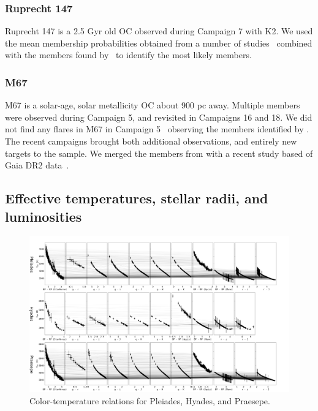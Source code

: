 \documentclass{aa}
\begin{document}
\subsubsection{Ruprecht 147}
Ruprecht 147 is a 2.5 Gyr old OC observed during Campaign 7 with K2. We used the mean membership probabilities obtained from a number of studies~\citep{curtis_ruprecht_2013, cantat_gaudin_2018, olivares_ngc6774_2019} combined with the members found by~\citet{gaia_dr2_2018_hrd} to identify the most likely members.
\subsubsection{M67}
M67 is a solar-age, solar metallicity OC about 900 pc away. Multiple members were observed during Campaign 5, and revisited in Campaigns 16 and 18. We did not find any flares in M67 in Campaign 5~ observing the members identified by \citet{gonzalez_m67mem_2016}. The recent campaigns brought both additional observations, and entirely new targets to the sample. We merged the members from \citet{gonzalez_m67mem_2016} with a recent study based of Gaia DR2 data~\citep{gao_m67mem_2018}.
\subsection{Effective temperatures, stellar radii, and luminosities}
\label{TeffRL}


   \begin{figure}
		\centering
           \includegraphics[angle=90, width=0.8\hsize]{pics/clusters/Teff_spread_young.png}

      \caption{Color-temperature relations for Pleiades, Hyades, and Praesepe.}
         \label{fig:pleiades_hyades_praesepe}
   \end{figure}
   
\end{document}
